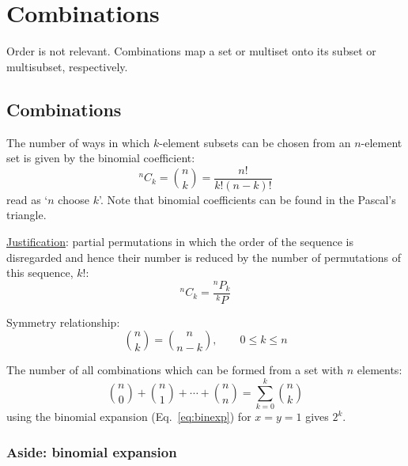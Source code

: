 \documentclass{article}
\begin{document}

\section{Combinations}

Order is not relevant. Combinations map a set or multiset onto its subset or multisubset, respectively.

\subsection{Combinations}
\label{combinations}

The number of ways in which $k$\nobreakdash-\hspace{0pt}element subsets can be chosen from an $n$\nobreakdash-\hspace{0pt}element set is given by the binomial coefficient:
%
\begin{equation}
    ^nC_k = \binom{n}{k} = \frac{n!}{k!(n-k)!}
\end{equation}
%
read as `$n$ choose $k$'. Note that binomial coefficients can be found in the Pascal's triangle.

\underline{Justification}: partial permutations in which the order of the sequence is disregarded and hence their number is reduced by the number of permutations of this sequence, $k!$:
%
\begin{equation}
        ^nC_k = \frac{^nP_k}{^kP}
\end{equation}

Symmetry relationship:
%
\begin{equation}
    \label{eq:symrel}
    \binom{n}{k} = \binom{n}{n-k}, \qquad 0 \le k \le n
\end{equation}

The number of all combinations which can be formed from a set with $n$ elements:
%
\begin{equation}
    \label{eq:all_comb}
    \binom{n}{0} + \binom{n}{1} + \dotsb + \binom{n}{n}= \sum_{k=0}^{k} \binom{n}{k}
\end{equation}
%
using the binomial expansion (Eq.~\ref{eq:binexp}) for $x=y=1$ gives $2^k$.

\subsubsection{Aside: binomial expansion}
\end{document}
